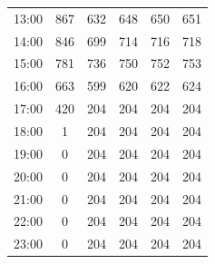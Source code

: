 \begin{table}[H]
{\begin{tabular}{cccccc}
13:00 & 867 & 632          & 648               & 650                & 651                   \\ 
14:00 & 846 & 699          & 714               & 716                & 718                   \\ 
15:00 & 781 & 736          & 750               & 752                & 753                   \\ 
16:00 & 663 & 599          & 620               & 622                & 624                   \\ 
17:00 & 420 & 204          & 204               & 204                & 204                   \\ 
18:00 & 1   & 204          & 204               & 204                & 204                   \\ 
19:00 & 0   & 204          & 204               & 204                & 204                   \\ 
20:00 & 0   & 204          & 204               & 204                & 204                   \\ 
21:00 & 0   & 204          & 204               & 204                & 204                   \\ 
22:00 & 0   & 204          & 204               & 204                & 204                   \\ 
23:00 & 0   & 204          & 204               & 204                & 204                   
\end{tabular}%
}
\end{table}

